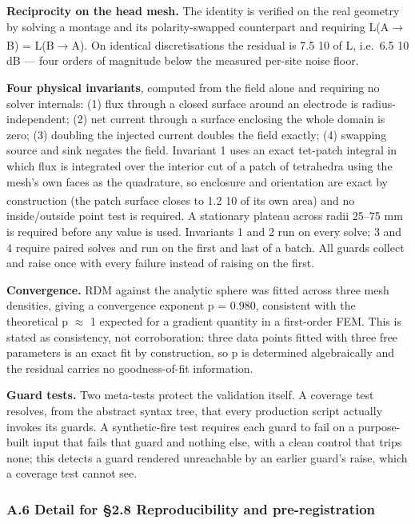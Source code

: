 \documentclass[manuscript,review,anonymous]{acmart}
\newcounter{none}
\begin{document}
\textbf{Reciprocity on the head mesh.} The identity is verified on the real geometry
by solving a montage and its polarity-swapped counterpart and requiring
L(A$\rightarrow$B) = \textminus{}L(B$\rightarrow$A). On identical discretisations the residual is 7.5 \texttimes{} 10\textsuperscript{} of
\textbar L\textbar, i.e.~6.5 \texttimes{} 10\textsuperscript{} dB --- four orders of magnitude below the measured per-site
noise floor.

\textbf{Four physical invariants}, computed from the field alone and requiring no
solver internals: (1) flux through a closed surface around an electrode is
radius-independent; (2) net current through a surface enclosing the whole domain
is zero; (3) doubling the injected current doubles the field exactly; (4)
swapping source and sink negates the field. Invariant 1 uses an exact tet-patch
integral in which flux is integrated over the interior cut of a patch of
tetrahedra using the mesh's own faces as the quadrature, so enclosure and
orientation are exact by construction (the patch surface closes to 1.2 \texttimes{} 10\textsuperscript{}
of its own area) and no inside/outside point test is required. A stationary
plateau across radii 25--75 mm is required before any value is used. Invariants 1
and 2 run on every solve; 3 and 4 require paired solves and run on the first and
last of a batch. All guards collect and raise once with every failure instead of
raising on the first.

\textbf{Convergence.} RDM against the analytic sphere was fitted across three mesh
densities, giving a convergence exponent p = 0.980, consistent with the
theoretical p $\approx$ 1 expected for a gradient quantity in a first-order FEM. This is
stated as consistency, not corroboration: three data points fitted with three
free parameters is an exact fit by construction, so p is determined
algebraically and the residual carries no goodness-of-fit information.

\textbf{Guard tests.} Two meta-tests protect the validation itself. A coverage test
resolves, from the abstract syntax tree, that every production script actually
invokes its guards. A synthetic-fire test requires each guard to fail on a
purpose-built input that fails that guard and nothing else, with a clean control
that trips none; this detects a guard rendered unreachable by an earlier guard's
raise, which a coverage test cannot see.

\subsubsection{A.6 Detail for \S{}2.8 Reproducibility and pre-registration}\label{a.6-detail-for-2.8-reproducibility-and-pre-registration}
\end{document}
